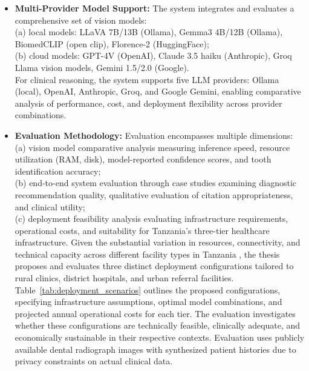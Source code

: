 \documentclass[12pt,a4paper]{report}
\begin{document}
\begin{itemize}
		\item \textbf{Multi-Provider Model Support:} The system integrates and evaluates a comprehensive set of vision models: \\
		(a) local models: LLaVA 7B/13B (Ollama), Gemma3 4B/12B (Ollama), BiomedCLIP (open clip), Florence-2 (HuggingFace); \\
		(b) cloud models: GPT-4V (OpenAI), Claude 3.5 haiku (Anthropic), Groq Llama vision models, Gemini 1.5/2.0 (Google). \\
		For clinical reasoning, the system supports five LLM providers: Ollama (local), OpenAI, Anthropic, Groq, and Google Gemini, enabling comparative analysis of performance, cost, and deployment flexibility across provider combinations.
		
		\item \textbf{Evaluation Methodology:} Evaluation encompasses multiple dimensions: \\
		(a) vision model comparative analysis measuring inference speed, resource utilization (RAM, disk), model-reported confidence scores, and tooth identification accuracy; \\
		(b) end-to-end system evaluation through case studies examining diagnostic recommendation quality, qualitative evaluation of citation appropriateness, and clinical utility; \\
		
		(c) deployment feasibility analysis evaluating infrastructure requirements, operational costs, and suitability for Tanzania's three-tier healthcare infrastructure. Given the substantial variation in resources, connectivity, and technical capacity across different facility types in Tanzania \cite{Edward2024OralHealthTZ}, the thesis proposes and evaluates three distinct deployment configurations tailored to rural clinics, district hospitals, and urban referral facilities. Table~\ref{tab:deployment_scenarios} outlines the proposed configurations, specifying infrastructure assumptions, optimal model combinations, and projected annual operational costs for each tier. The evaluation investigates whether these configurations are technically feasible, clinically adequate, and economically sustainable in their respective contexts. Evaluation uses publicly available dental radiograph images with synthesized patient histories due to privacy constraints on actual clinical data.
		
	\end{itemize}
	
\end{document}
